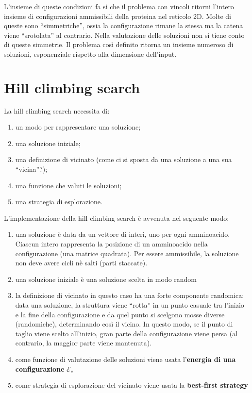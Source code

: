 \documentclass[conference]{IEEEtran}
\begin{document}
L'insieme di queste condizioni fa sì che il problema con vincoli ritorni l'intero insieme di configurazioni ammissibili della proteina nel reticolo 2D. Molte di queste sono ``simmetriche'', ossia la configurazione rimane la stessa ma la catena viene ``srotolata'' al contrario. Nella valutazione delle soluzioni non si tiene conto di queste simmetrie. Il problema così definito ritorna un insieme numeroso di soluzioni, esponenziale rispetto alla dimensione dell'input.

\section{Hill climbing search}

La hill climbing search necessita di:

\begin{enumerate}
 \item un modo per rappresentare una soluzione;
 \item una soluzione iniziale;
 \item una definizione di vicinato (come ci si sposta da una soluzione a una sua ``vicina''?);
 \item una funzione che valuti le soluzioni;
 \item una strategia di esplorazione.
\end{enumerate}

L'implementazione della hill climbing search è avvenuta nel seguente modo:

\begin{enumerate}
 \item una soluzione è data da un vettore di interi, uno per ogni amminoacido. Ciascun intero rappresenta la posizione di un amminoacido nella configurazione (una matrice quadrata). Per essere ammissibile, la soluzione non deve avere cicli nè salti (parti staccate).
 \item una soluzione iniziale è una soluzione scelta in modo random
 \item la definizione di vicinato in questo caso ha una forte componente randomica: data una soluzione, la struttura viene ``rotta'' in un punto casuale tra l'inizio e la fine della configurazione e da quel punto si scelgono mosse diverse (randomiche), determinando così il vicino. In questo modo, se il punto di taglio viene scelto all'inizio, gran parte della configurazione viene persa (al contrario, la maggior parte viene mantenuta).
 \item come funzione di valutazione delle soluzioni viene usata l'\textbf{energia di una configurazione} $\mathcal{E}_c$
 \item come strategia di esplorazione del vicinato viene usata la \textbf{best-first strategy}
\end{enumerate}
\end{document}
